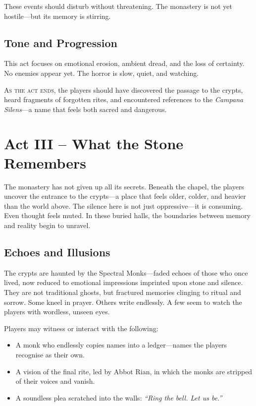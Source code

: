\documentclass[twocolumn,nodeprecatedcode,bg=print]{dndbook/dndbook}
\begin{document}
These events should disturb without threatening. The monastery is not yet hostile—but its memory is stirring.

\subsection{Tone and Progression}

This act focuses on emotional erosion, ambient dread, and the loss of certainty. No enemies appear yet. The horror is slow, quiet, and watching.


\vspace{\baselineskip}\noindent
\textsc{As the act ends}, the players should have discovered the passage to the crypts, heard fragments of forgotten rites, and encountered references to the \emph{Campana Silens}—a name that feels both sacred and dangerous.



\section*{Act III – What the Stone Remembers}

The monastery has not given up all its secrets. Beneath the chapel, the players uncover the entrance to the crypts—a place that feels older, colder, and heavier than the world above. The silence here is not just oppressive—it is consuming. Even thought feels muted. In these buried halls, the boundaries between memory and reality begin to unravel.

\subsection{Echoes and Illusions}

The crypts are haunted by the Spectral Monks—faded echoes of those who once lived, now reduced to emotional impressions imprinted upon stone and silence. They are not traditional ghosts, but fractured memories clinging to ritual and sorrow. Some kneel in prayer. Others write endlessly. A few seem to watch the players with wordless, unseen eyes.

Players may witness or interact with the following:
\begin{WyrdExample}
    \begin{itemize}
        \item A monk who endlessly copies names into a ledger—names the players recognise as their own.
        \item A vision of the final rite, led by Abbot Rian, in which the monks are stripped of their voices and vanish.
        \item A soundless plea scratched into the walls: \emph{“Ring the bell. Let us be.”}
    \end{itemize}
\end{WyrdExample}
\end{document}

